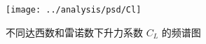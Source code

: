 

\begin{figure}
	\centering
	\texttt{[image: ../analysis/psd/Cl]}
	\caption{不同达西数和雷诺数下升力系数 $C_L$ 的频谱图}
	\label{fig: spectrum-Cl}
\end{figure}

